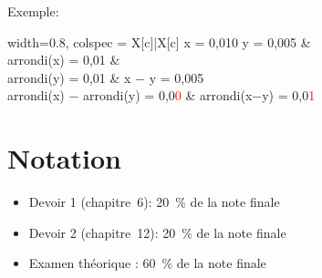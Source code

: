 Exemple:

\noindent
\begin{center}
	\begin{tblr}{
		width=0.8\linewidth,
		colspec = {X[c]|X[c]}
	}
		 x = 0,010 \qquad y = 0,005       &                                        \\ \hline
		arrondi(x) = 0,01                                 &                                        \\
		arrondi(y) = 0,01                                 & x $-$ y = 0,005                        \\
		arrondi(x) $-$ arrondi(y) = 0,0\textcolor{red}{0} & arrondi(x$-$y) = 0,0\textcolor{red}{1}
	\end{tblr}
\end{center}



\section*{Notation}
\begin{itemize}
	\item Devoir 1 (chapitre~6): 20~\% de la note finale
	\item Devoir 2 (chapitre~12): 20~\% de la note finale
	\item Examen théorique : 60~\% de la note finale
\end{itemize}
